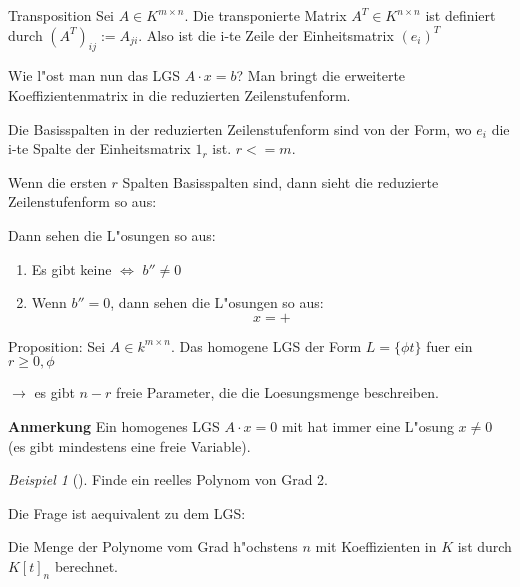 \documentclass[11pt]{article}
\theoremstyle{remark}
\newtheorem{exa}{Beispiel}[section]
\theoremstyle{definition}
\theoremstyle{remark}
\begin{document}
\begin{definition}{Transposition}{}
Sei \(A\in K^{m\times n}\). Die transponierte Matrix \(A^{T}\in K^{n\times n}\) ist
definiert durch \((A^T)_{ij}:=A_{ji}\). Also ist die i-te Zeile der Einheitsmatrix \((e_i)^T\)
\end{definition}

Wie l"ost man nun das LGS \(A\cdot x=b\)? Man bringt die erweiterte
Koeffizientenmatrix in die reduzierten Zeilenstufenform.

\begin{relation}
Die Basisspalten in der reduzierten Zeilenstufenform sind von der Form, wo \(e_i\)
die i-te Spalte der Einheitsmatrix \(1_r\) ist. \(r <= m\).
\end{relation}

Wenn die ersten \(r\) Spalten Basisspalten sind, dann sieht die reduzierte
Zeilenstufenform so aus:


Dann sehen die L"osungen so aus:
\begin{relation}
\begin{enumerate}
\item Es gibt keine \(\iff\) \(b''\not= 0\)
\item Wenn \(b''=0\), dann sehen die L"osungen so aus: \[x=+\]
\end{enumerate}
\end{relation}

Proposition: Sei \(A\in k^{m\times n}\). Das homogene LGS der Form \(L=\{\phi
t \}\) fuer ein \(r\geq 0, \phi\)

\(\rightarrow\) es gibt \(n-r\) freie Parameter, die die Loesungsmenge beschreiben.

\textbf{Anmerkung} Ein homogenes LGS \(A\cdot x=0\) mit  hat immer eine L"osung \(x\not=
0\) (es gibt mindestens eine freie Variable).


\begin{exa}[] \label{}
Finde ein reelles Polynom von Grad 2.

Die Frage ist aequivalent zu dem LGS:
\end{exa}

\begin{definition}{}{}
Die Menge der Polynome vom Grad h"ochstens \(n\) mit Koeffizienten in \(K\) ist
durch \(K[t]_n\) berechnet.
\end{definition}
\end{document}
